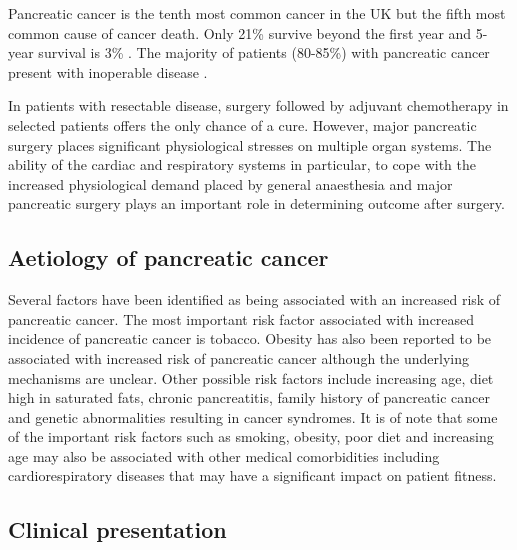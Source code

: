 Pancreatic cancer is the tenth most common cancer in the UK but the fifth most common cause of cancer death. 
Only 21\% survive beyond the first year and 5-year survival is 3\% \parencite{cancerresearchuk_cancer_2011}. 
The majority of patients (80-85\%) with pancreatic cancer present with inoperable disease \parencite{cancerresearchuk_cancer_2011,sener_pancreatic_1999}. 

In patients with resectable disease, surgery \parencite{sener_pancreatic_1999, sohn_resected_2000,geer_prognostic_1993} followed by adjuvant chemotherapy in selected patients \parencite{neoptolemos_randomized_2004, neoptolemos_adjuvant_2009} offers the only chance of a cure. 
However, major pancreatic surgery places significant physiological stresses on multiple organ systems. 
The ability of the cardiac and respiratory systems in particular, to cope with the increased physiological demand placed by general anaesthesia and major pancreatic surgery plays an important role in determining outcome after surgery.

\subsection{Aetiology of pancreatic cancer}
Several factors have been identified as being associated with an increased risk of pancreatic cancer.
The most important risk factor associated with increased incidence of pancreatic cancer is tobacco. 
Obesity has also been reported to be associated with increased risk of pancreatic cancer although the underlying mechanisms are unclear.
Other possible risk factors include increasing age, diet high in saturated fats, chronic pancreatitis, family history of pancreatic cancer and genetic abnormalities resulting in cancer syndromes.
It is of note that some of the important risk factors such as smoking, obesity, poor diet and increasing age may also be associated with other medical comorbidities including cardiorespiratory diseases that may have a significant impact on patient fitness.

\subsection{Clinical presentation}

